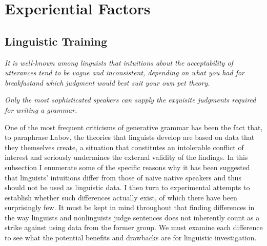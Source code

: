 \section{Experiential Factors}\label{sec:4.4}

\subsection{Linguistic Training} \label{sec:4.4.1}

\epigraph{\textit{It is well-known among linguists that intuitions about the acceptability of utterances tend to be vague and inconsistent, depending on what you had for breakfast}\footnotemark\textit{and which judgment  would best suit your own pet theory.}\footnotemark\\[-2\baselineskip]}{\citep{Dahl1979}}


\epigraph{\textit{Only the most sophisticated  speakers can supply the exquisite judgments  required for  writing a grammar.}\\[-2\baselineskip]}{\citep{GleitmanEtAl1970}}



\noindent One of the most frequent criticisms of generative grammar has been the fact that, to paraphrase Labov, the theories that linguists develop are based on data that they themselves create, a situation that constitutes an intolerable conflict of interest and seriously undermines the external validity of the findings. In this subsection I enumerate some of the specific reasons why it has been suggested that linguists' intuitions differ from those of naive native speakers and thus should not be used as linguistic data. I then turn to experimental attempts to establish whether such differences actually exist, of which there have been surprisingly few. It must be kept in mind throughout that finding differences in the way linguists
and nonlinguists judge sentences does not inherently count as a strike against using data from the former group. We must examine each difference to see what the potential benefits and drawbacks are for linguistic investigation.

